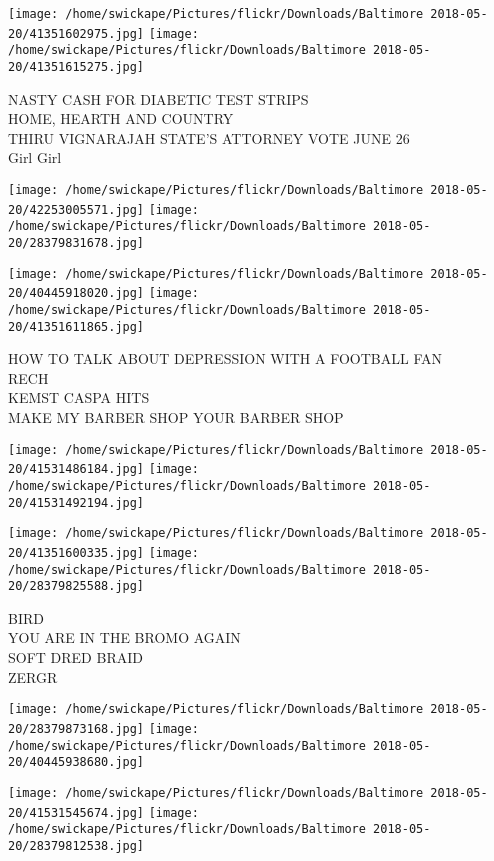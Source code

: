 \documentclass[10pt,letterpaper]{article}
\begin{document}
\texttt{[image: /home/swickape/Pictures/flickr/Downloads/Baltimore 2018-05-20/41351602975.jpg]}
\texttt{[image: /home/swickape/Pictures/flickr/Downloads/Baltimore 2018-05-20/41351615275.jpg]}

NASTY CASH FOR DIABETIC TEST STRIPS\\
HOME, HEARTH AND COUNTRY\\
THIRU VIGNARAJAH STATE'S ATTORNEY VOTE JUNE 26\\
Girl Girl
\pagebreak

\texttt{[image: /home/swickape/Pictures/flickr/Downloads/Baltimore 2018-05-20/42253005571.jpg]}
\texttt{[image: /home/swickape/Pictures/flickr/Downloads/Baltimore 2018-05-20/28379831678.jpg]}

\texttt{[image: /home/swickape/Pictures/flickr/Downloads/Baltimore 2018-05-20/40445918020.jpg]}
\texttt{[image: /home/swickape/Pictures/flickr/Downloads/Baltimore 2018-05-20/41351611865.jpg]}

HOW TO TALK ABOUT DEPRESSION WITH A FOOTBALL FAN\\
RECH\\
KEMST CASPA HITS\\
MAKE MY BARBER SHOP YOUR BARBER SHOP
\pagebreak

\texttt{[image: /home/swickape/Pictures/flickr/Downloads/Baltimore 2018-05-20/41531486184.jpg]}
\texttt{[image: /home/swickape/Pictures/flickr/Downloads/Baltimore 2018-05-20/41531492194.jpg]}

\texttt{[image: /home/swickape/Pictures/flickr/Downloads/Baltimore 2018-05-20/41351600335.jpg]}
\texttt{[image: /home/swickape/Pictures/flickr/Downloads/Baltimore 2018-05-20/28379825588.jpg]}

BIRD\\
YOU ARE IN THE BROMO AGAIN\\
SOFT DRED BRAID\\
ZERGR
\pagebreak

\texttt{[image: /home/swickape/Pictures/flickr/Downloads/Baltimore 2018-05-20/28379873168.jpg]}
\texttt{[image: /home/swickape/Pictures/flickr/Downloads/Baltimore 2018-05-20/40445938680.jpg]}

\texttt{[image: /home/swickape/Pictures/flickr/Downloads/Baltimore 2018-05-20/41531545674.jpg]}
\texttt{[image: /home/swickape/Pictures/flickr/Downloads/Baltimore 2018-05-20/28379812538.jpg]}
\end{document}
